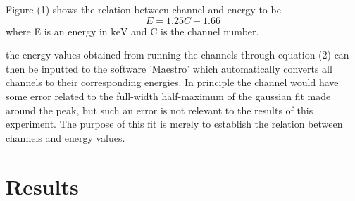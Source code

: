 \documentclass[11pt]{article} %
\begin{document}
    Figure (1) shows the relation between channel and energy to be
    \begin{equation}\label{C_to_E}
        E = 1.25C + 1.66
    \end{equation}
    where E is an energy in $\unit{\keV}$ and C is the channel number.

    the energy values obtained from running the channels through equation (2) can then be inputted to the software 'Maestro' which automatically converts all channels to their corresponding energies. In principle the channel would have some error related to the full-width half-maximum of the gaussian fit made around the peak, but such an error is not relevant to the results of this experiment. The purpose of this fit is merely to establish the relation between channels and energy values.


\section{Results}
\end{document}
